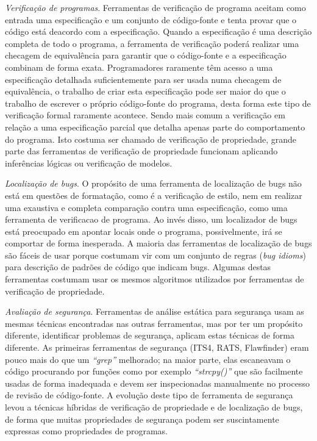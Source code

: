 \begin{description}
  \item \textit{Verificação de programas}.
    Ferramentas de verificação de programa aceitam como entrada uma especificação
    e um conjunto de código-fonte e tenta provar que o código está deacordo
    com a especificação. Quando a especificação é uma descrição completa de
    todo o programa, a ferramenta de verificação poderá realizar uma checagem
    de equivalência para garantir que o código-fonte e a especificação
    combinam de forma exata. Programadores raramente têm acesso a uma
    especificação detalhada suficientemente para ser usada numa checagem de
    equivalência, o trabalho de criar esta especificação pode ser maior do que
    o trabalho de escrever o próprio código-fonte do programa, desta forma
    este tipo de verificação formal raramente acontece. Sendo mais comum a
    verificação em relação a uma especificação parcial que detalha apenas
    parte do comportamento do programa. Isto costuma ser chamado de
    verificação de propriedade, grande parte das ferramentas de verificação de
    propriedade funcionam aplicando inferências lógicas ou verificação de
    modelos.

  \item \textit{Localização de bugs}. 
    O propósito de uma ferramenta de localização de bugs não está em questões de
    formatação, como é a verificação de estilo, nem em realizar uma exaustiva
    e completa comparação contra uma especificação, como uma ferramenta de
    verificacao de programa. Ao invés disso, um localizador de bugs está
    preocupado em apontar locais onde o programa, possivelmente, irá se
    comportar de forma inesperada. A maioria das ferramentas de localização de
    bugs são fáceis de usar porque costumam vir com um conjunto de regras
    ({\it bug idioms}) para descrição de padrões de código que indicam bugs.
    Algumas destas ferramentas costumam usar os mesmos algoritmos utilizados
    por ferramentas de verificação de propriedade.

  \item \textit{Avaliação de segurança}. 
    Ferramentas de análise estática para segurança usam as mesmas técnicas
    encontradas nas outras ferramentas, mas por ter um propósito diferente,
    identificar problemas de segurança, aplicam estas técnicas de forma diferente.
    As primeiras ferramentas de segurança (ITS4, RATS, Flawfinder) eram pouco mais
    do que um {\it ``grep''} melhorado; na maior parte, elas escaneavam o código
    procurando por funções como por exemplo {\it ``strcpy()''} que são
    facilmente usadas de forma inadequada e devem ser inspecionadas
    manualmente no processo de revisão de código-fonte. A evolução deste tipo
    de ferramenta de segurança levou a técnicas híbridas de verificação de
    propriedade e de localização de bugs, de forma que muitas propriedades de
    segurança podem ser suscintamente expressas como propriedades de
    programas.

\end{description}

